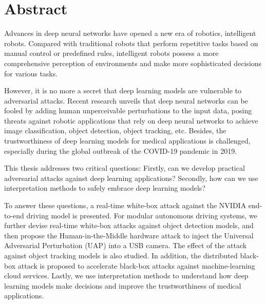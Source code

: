 \chapter*{Abstract}

Advances in deep neural networks have opened a new era of robotics, intelligent robots. Compared with traditional robots that perform repetitive tasks based on manual control or predefined rules, intelligent robots possess a more comprehensive perception of environments and make more sophisticated decisions for various tasks.
 
However, it is no more a secret that deep learning models are vulnerable to adversarial attacks. Recent research unveils that deep neural networks can be fooled by adding human unperceivable perturbations to the input data, posing threats against robotic applications that rely on deep neural networks to achieve image classification, object detection, object tracking, etc. Besides, the trustworthiness of deep learning models for medical applications is challenged, especially during the global outbreak of the COVID-19 pandemic in 2019.

This thesis addresses two critical questions: Firstly, can we develop practical adversarial attacks against deep learning applications? Secondly, how can we use interpretation methods to safely embrace deep learning models?

To answer these questions, a real-time white-box attack against the NVIDIA end-to-end driving model is presented. For modular autonomous driving systems, we further devise real-time white-box attacks against object detection models, and then propose the Human-in-the-Middle hardware attack to inject the Universal Adversarial Perturbation (UAP) into a USB camera. The effect of the attack against object tracking models is also studied. In addition, the distributed black-box attack is proposed to accelerate black-box attacks against machine-learning cloud services. Lastly, we use interpretation methods to understand how deep learning models make decisions and improve the trustworthiness of medical applications.


